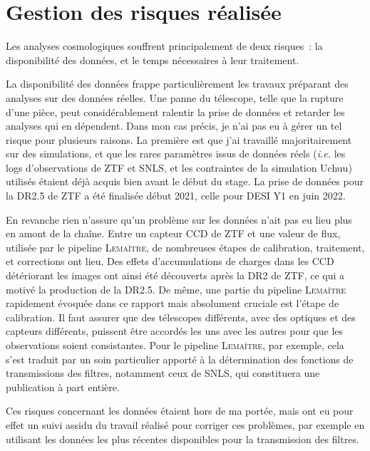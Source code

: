 \documentclass{book}
\def\lemaitre{\textsc{Lemaître}\xspace}
\begin{document}
\section{Gestion des risques réalisée}


Les analyses cosmologiques souffrent principalement de deux risques~: la disponibilité des données, et le temps nécessaires à leur traitement.

La disponibilité des données frappe particulièrement les travaux préparant des analyses sur des données réelles. Une panne du télescope, telle que la rupture d'une pièce, peut considérablement ralentir la prise de données et retarder les analyses qui en dépendent. Dans mon cas précis, je n'ai pas eu à gérer un tel risque pour plusieurs raisons. La première est que j'ai travaillé majoritairement sur des simulations, et que les rares paramètres issus de données réels (\textit{i.e.} les logs d'observations de ZTF et SNLS, et les contraintes de la simulation Uchuu) utilisés étaient déjà acquis bien avant le début du stage. La prise de données pour la DR2.5 de ZTF a été finalisée début 2021, celle pour DESI Y1 en juin 2022.

En revanche rien n'assure qu'un problème sur les données n'ait pas eu lieu plus en amont de la chaîne. Entre un capteur CCD de ZTF et une valeur de flux, utilisée par le pipeline \lemaitre, de nombreuses étapes de calibration, traitement, et corrections ont lieu. Des effets d'accumulations de charges dans les CCD détériorant les images ont ainsi été découverts après la DR2 de ZTF, ce qui a motivé la production de la DR2.5. De même, une partie du pipeline \lemaitre rapidement évoquée dans ce rapport mais absolument cruciale est l'étape de calibration. Il faut assurer que des télescopes différents, avec des optiques et des capteurs différents, puissent être accordés les uns avec les autres pour que les observations soient consistantes. Pour le pipeline \lemaitre, par exemple, cela s'est traduit par un soin particulier apporté à la détermination des fonctions de transmissions des filtres, notamment ceux de SNLS, qui constituera une publication à part entière.

Ces risques concernant les données étaient hors de ma portée, mais ont eu pour effet un suivi assidu du travail réalisé pour corriger ces problèmes, par exemple en utilisant les données les plus récentes disponibles pour la transmission des filtres.
\end{document}
